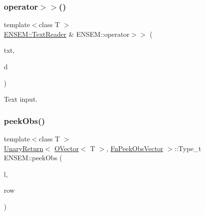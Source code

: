 \subsubsection{\texorpdfstring{operator$>$$>$()}{operator>>()}\hspace{0.1cm}{\footnotesize\ttfamily [2/2]}}
{\footnotesize\ttfamily template$<$class T $>$ \\
\mbox{\hyperlink{classENSEM_1_1TextReader}{E\+N\+S\+E\+M\+::\+Text\+Reader}} \& E\+N\+S\+E\+M\+::operator$>$$>$ (\begin{DoxyParamCaption}\item[{\mbox{\hyperlink{classENSEM_1_1TextReader}{E\+N\+S\+E\+M\+::\+Text\+Reader}} \&}]{txt,  }\item[{\mbox{\hyperlink{classENSEM_1_1OVector}{O\+Vector}}$<$ T $>$ \&}]{d }\end{DoxyParamCaption})\hspace{0.3cm}{\ttfamily [inline]}}



Text input. 

\mbox{\label{group__obsvector_ga8d085844df795594177550f3748fb6a5}} 
\subsubsection{\texorpdfstring{peekObs()}{peekObs()}}
{\footnotesize\ttfamily template$<$class T $>$ \\
\mbox{\hyperlink{structENSEM_1_1UnaryReturn}{Unary\+Return}}$<$ \mbox{\hyperlink{classENSEM_1_1OVector}{O\+Vector}}$<$ T $>$, \mbox{\hyperlink{structENSEM_1_1FnPeekObsVector}{Fn\+Peek\+Obs\+Vector}} $>$\+::Type\+\_\+t E\+N\+S\+E\+M\+::peek\+Obs (\begin{DoxyParamCaption}\item[{const \mbox{\hyperlink{classENSEM_1_1OVector}{O\+Vector}}$<$ T $>$ \&}]{l,  }\item[{int}]{row }\end{DoxyParamCaption})\hspace{0.3cm}{\ttfamily [inline]}}

\mbox{\label{group__obsvector_ga53ddc54421a1f3fa7ee2ed55f15627a6}} 
